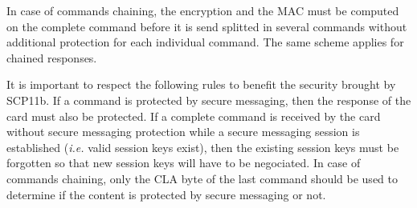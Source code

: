 \documentclass[dvipdfmx,11pt,a4paper,english,final]{article}
\newcommand{\ie}[0]{\textit{i.e.}\xspace}
\begin{document}
In case of commands chaining, the encryption and the MAC must be
computed on the complete command before it is send splitted in several
commands without additional protection for each individual
command. The same scheme applies for chained responses.

It is important to respect the following rules to benefit the security
brought by SCP11b. If a command is protected by secure messaging, then
the response of the card must also be protected. If a complete command
is received by the card without secure messaging protection while a
secure messaging session is established (\ie valid session keys
exist), then the existing session keys must be forgotten so that new
session keys will have to be negociated. In case of commands chaining,
only the CLA byte of the last command should be used to determine if
the content is protected by secure messaging or not.



\end{document}
